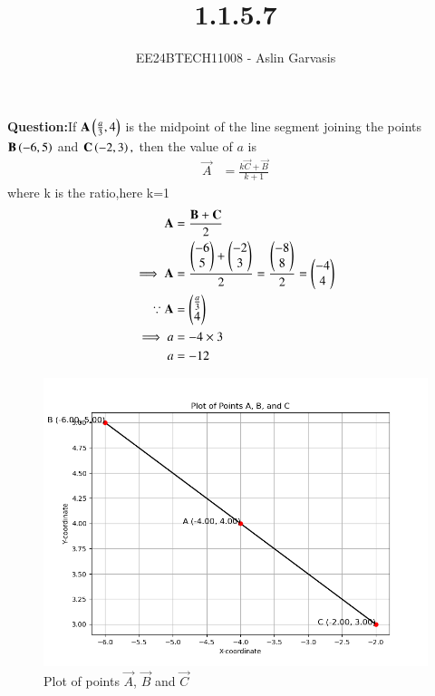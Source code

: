 \documentclass[journal]{IEEEtran}
\begin{document}

\vspace{3cm}
\title{1.1.5.7}
\author{EE24BTECH11008 - Aslin Garvasis
}
{\let\newpage\relax\maketitle}

\renewcommand{\thefigure}{\theenumi}
\renewcommand{\thetable}{\theenumi}
\setlength{\intextsep}{10pt} %


\renewcommand{\thetable}{\theenumi}
 \textbf{Question:}If $\mathbf{A}\left(\frac{a}{3},4\right)$ is the midpoint of the line segment joining the points $\mathbf{B}\left(-6,5\right)$ and $\mathbf{C}\left(-2,3\right),$  
		then the value of $a$ is\\
 
 \solution 
\begin{align}
\vec{A} &=\frac{k\vec{C}+\vec{B}}{k+1}
\end{align}	
			where k is the ratio,here k=1\\
\begin{align}
 \mathbf{A}&=\frac{\mathbf{B}+\mathbf{C}}{2}\\ 
\implies \mathbf{A}&=\frac{\begin{pmatrix}-6\\5\end{pmatrix}+\begin{pmatrix}-2\\3\end{pmatrix}}{2}=\frac{\begin{pmatrix}-8\\8\end{pmatrix}}{2}=\begin{pmatrix}-4\\4\end{pmatrix}\\
\because \mathbf{A}&=\begin{pmatrix}\frac{a}{3}\\4\end{pmatrix}\\
\implies a&=-4\times3\\ 
 a&=-12
\end{align}
		\newpage


		\begin{figure}[h!]
                \centering
               \includegraphics[width=0.7\linewidth]{figs/Fig1.png}
			\caption{Plot of points $\vec{A}$, $\vec{B}$ and $\vec{C}$}
               
               \end{figure}
\end{document}

